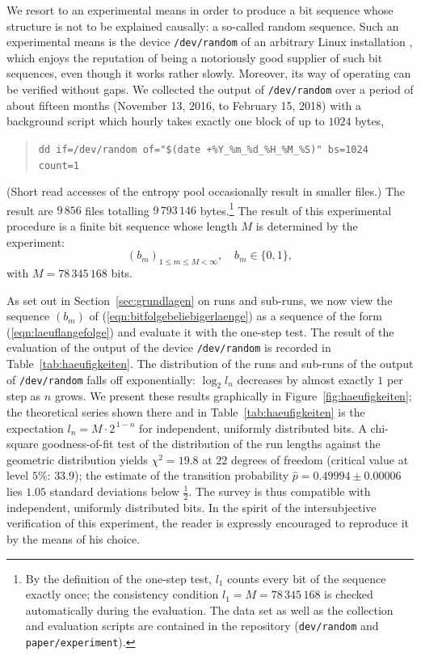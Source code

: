 \documentclass[11pt,a4paper]{scrartcl}
\theoremstyle{plain}
\theoremstyle{definition}
\theoremstyle{remark}
\begin{document}
We resort to an experimental means in order to produce a bit sequence
whose structure is not to be explained causally: a so-called random
sequence. Such an experimental means is the device
\texttt{/dev/random} of an arbitrary Linux installation
\cite{gutterman2004}, which enjoys the reputation of being a
notoriously good supplier of such bit sequences, even though it works
rather slowly. Moreover, its way of operating can be verified
without gaps. We collected the output of \texttt{/dev/random} over a
period of about fifteen months (November 13, 2016, to February 15,
2018) with a background script which hourly takes exactly one block
of up to $1024$ bytes,
\begin{quote}
\verb|dd if=/dev/random of="$(date +%Y_%m_%d_%H_%M_%S)" bs=1024 count=1|
\end{quote}
(Short read accesses of the entropy pool occasionally result in
smaller files.) The result are $9\,856$ files totalling
$9\,793\,146$ bytes.\footnote{By the definition of the one-step test,
$l_1$ counts every bit of the sequence exactly once; the consistency
condition $l_1=M=78\,345\,168$ is checked automatically during the
evaluation. The data set as well as the collection and evaluation
scripts are contained in the repository (\texttt{dev/random} and
\texttt{paper/experiment}).}
The result of this experimental procedure is a finite bit sequence
whose length $M$ is determined by the experiment:
\begin{equation}\label{eqn:bitfolgebeliebigerlaenge}
  (b_m)_{1\leq m\leq M<\infty},\quad b_m\in\{0,1\},
\end{equation}
with $M=78\,345\,168$ bits.

\noindent As set out in Section~\ref{sec:grundlagen} on runs and
sub-runs, we now view the sequence $(b_m)$ of
(\ref{eqn:bitfolgebeliebigerlaenge}) as a sequence of the form
(\ref{eqn:laeuflangefolge}) and evaluate it with the one-step test.
The result of the evaluation of the output of the device
\texttt{/dev/random} is recorded in Table~\ref{tab:haeufigkeiten}.
The distribution of the runs and sub-runs of the output of
\texttt{/dev/random} falls off exponentially: $\log_2 l_n$ decreases
by almost exactly $1$ per step as $n$ grows. We present these results
graphically in Figure~\ref{fig:haeufigkeiten}; the theoretical series
shown there and in Table~\ref{tab:haeufigkeiten} is the expectation
$l_n=M\cdot 2^{\,1-n}$ for independent, uniformly distributed bits. A
chi-square goodness-of-fit test of the distribution of the run
lengths against the geometric distribution yields $\chi^2=19.8$ at
$22$ degrees of freedom (critical value at level $5\%$: $33.9$); the
estimate of the transition probability
$\hat p=0.49994\pm 0.00006$ lies $1.05$ standard deviations below
$\tfrac12$. The survey is thus compatible with independent, uniformly
distributed bits. In the spirit of the intersubjective verification of
this experiment, the reader is expressly encouraged to reproduce it by
the means of his choice.
\end{document}
